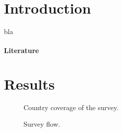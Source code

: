 \documentclass[12pt,english]{article}
\begin{document}
\begin{bibunit}

\section{Introduction}%
bla

\paragraph{Literature} 

\section{Results}

\begin{figure}[h!]
    \caption[Country coverage]{Country coverage of the survey.
    }\label{fig:country_coverage}
\end{figure}
\begin{figure}[h!]
    \caption[Survey flow]{Survey flow.
    }\label{fig:flow}

\end{figure}
\end{bibunit}
\end{document}
